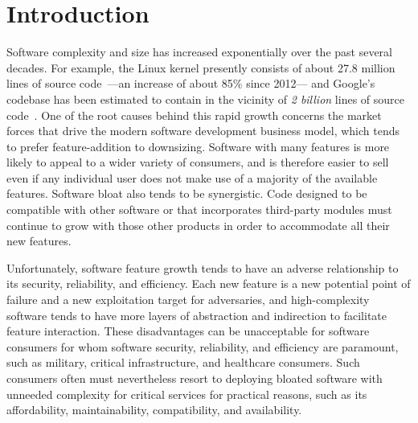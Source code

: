 \documentclass[sigconf]{acmart}
\begin{document}

\maketitle

\section{Introduction}

Software complexity and size has increased exponentially over the past several decades.
For example, the Linux kernel presently consists of about 27.8 million lines of source code~\cite{bhartiya}---an increase of about 85\% since 2012---%
and Google's codebase has been estimated to contain in the vicinity of \emph{2 billion} lines of source code~\cite{potvin}.
One of the root causes behind this rapid growth concerns the market forces that drive the modern software development business model,
which tends to prefer feature-addition to downsizing.
Software with many features is more likely to appeal to a wider variety of consumers, and is therefore easier to sell even if any individual user does not make use of a majority of the available features.
Software bloat also tends to be synergistic.
Code designed to be compatible with other software or that incorporates third-party modules must continue to grow with those other products in order to accommodate all their new features.

Unfortunately, software feature growth tends to have an adverse relationship to its security, reliability, and efficiency.
Each new feature is a new potential point of failure and a new exploitation target for adversaries,
and high-complexity software tends to have more layers of abstraction and indirection to facilitate feature interaction.
These disadvantages can be unacceptable for software consumers for whom software security, reliability, and efficiency are paramount,
such as military, critical infrastructure, and healthcare consumers.
Such consumers often must nevertheless resort to deploying bloated software with unneeded complexity for critical services for practical reasons,
such as its affordability, maintainability, compatibility, and availability.
\end{document}
